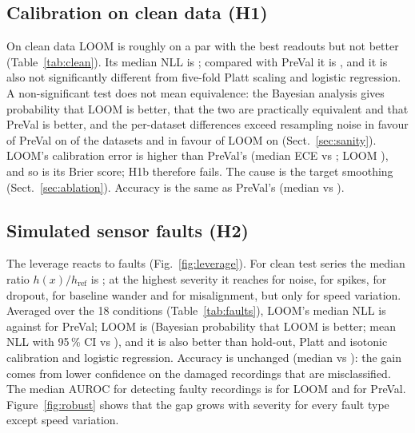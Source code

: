\documentclass[preprint,12pt,authoryear]{elsarticle}
\begin{document}
\subsection{Calibration on clean data (H1)}\label{sec:clean}
On clean data LOOM is roughly on a par with the best readouts but not better (Table~\ref{tab:clean}). Its median NLL is \NLLCleanLoom; compared with PreVal it is \CmpNLLCleanPreVal, and it is also not significantly different from five-fold Platt scaling and logistic regression. A non-significant test does not mean equivalence: the Bayesian analysis gives probability \BayesCleanPreValBetter{} that LOOM is better, \BayesCleanPreValEquiv{} that the two are practically equivalent and \BayesCleanPreValWorse{} that PreVal is better, and the per-dataset differences exceed resampling noise in favour of PreVal on \NoiseCleanPreVal{} of the datasets and in favour of LOOM on \NoiseCleanLoom{} (Sect.~\ref{sec:sanity}). LOOM's calibration error is higher than PreVal's (median ECE \ECECleanLoom{} vs \ECECleanPreVal; LOOM \CmpECECleanPreVal), and so is its Brier score; H1b therefore fails. The cause is the target smoothing (Sect.~\ref{sec:ablation}). Accuracy is the same as PreVal's (median \AccCleanLoom{} vs \AccCleanPreVal).

\begin{table}[!htbp]
\caption{Clean test data, \NDatasets{} datasets: median over datasets of the mean over resamples. W/D/L counts datasets on which LOOM is better/equal/worse in NLL; $p$ is the Holm-adjusted Wilcoxon $p$-value for NLL.}\label{tab:clean}
\centering\scriptsize

\end{table}

\subsection{Simulated sensor faults (H2)}\label{sec:faults}
The leverage reacts to faults (Fig.~\ref{fig:leverage}). For clean test series the median ratio $h(x)/h_{\mathrm{ref}}$ is \LevClean; at the highest severity it reaches \LevNoise{} for noise, \LevSpikes{} for spikes, \LevMissing{} for dropout, \LevWander{} for baseline wander and \LevShift{} for misalignment, but only \LevWarp{} for speed variation. Averaged over the 18 conditions (Table~\ref{tab:faults}), LOOM's median NLL is \NLLFaultsLoom{} against \NLLFaultsPreVal{} for PreVal; LOOM is \CmpNLLFaultsPreVal{} (Bayesian probability \BayesFaultsPreValBetter{} that LOOM is better; mean NLL with 95\,\% CI \CINLLFaultsLoom{} vs \CINLLFaultsPreVal), and it is also better than hold-out, Platt and isotonic calibration and logistic regression. Accuracy is unchanged (median \AccFaultsLoom{} vs \AccFaultsPreVal): the gain comes from lower confidence on the damaged recordings that are misclassified. The median AUROC for detecting faulty recordings is \AUROCFaultsLoom{} for LOOM and \AUROCFaultsPreVal{} for PreVal. Figure~\ref{fig:robust} shows that the gap grows with severity for every fault type except speed variation.
\end{document}
